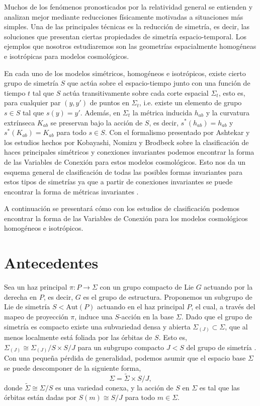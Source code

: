 Muchos de los fen\'{o}menos pronosticados por la relatividad general se entienden y analizan mejor mediante reducciones f\'{i}sicamente motivadas a situaciones m\'{a}s simples. Una de las principales t\'{e}cnicas es la reducci\'{o}n de simetr\'{i}a, es decir, las soluciones que presentan ciertas propiedades de simetr\'{i}a espacio-temporal. Los ejemplos que nosotros estudiaremos son las geometr\'{i}as espacialmente homog\'{e}neas e isotr\'{o}picas para modelos cosmol\'{o}gicos.

En cada uno de los modelos sim\'{e}tricos, homog\'{e}neos e isotr\'{o}picos, existe cierto grupo de simetr\'{i}a $S$ que act\'{u}a sobre el espacio-tiempo junto con una funci\'{o}n de tiempo $t$ tal que $S$ act\'{u}a transitivamente sobre cada corte espacial $\Sigma_{t}$, esto es, para cualquier par $(y, y')$ de puntos en $\Sigma_{t}$, i.e. existe un elemento de grupo $s \in S$ tal que $s(y) = y'$. Adem\'{a}s, en $\Sigma_{t}$  la m\'{e}trica inducida $h_{ab}$ y la curvatura extr\'{i}nseca $K_{ab}$ se preservan bajo la acci\'{o}n de $S$, es decir, $s^{*}(h_{ab}) = h_{ab}$ y $s^{*}(K_{ab}) = K_{ab}$ para todo $s \in S$. Con el formalismo presentado por Ashtekar \cite{Ashtekar86, Ashtekar87} y los estudios hechos por Kobayashi, Nomizu y Brodbeck sobre la clasificaci\'{o}n de haces principales sim\'{e}tricos y conexiones invariantes \cite{Kobayashi, Brodbeck} podemos encontrar la forma de las Variables de Conexi\'{o}n para estos modelos cosmol\'{o}gicos. Esto nos da un esquema general de clasificaci\'{o}n de todas las posibles formas invariantes para estos tipos de simetr\'{i}as ya que a partir de conexiones invariantes se puede encontrar la forma de m\'{e}tricas invariantes \cite{BuildInvariantMetricsFromInvariantConexions}.

A continuaci\'{o}n se presentar\'{a} c\'{o}mo con los estudios de clasificaci\'{o}n podemos encontrar la forma de las Variables de Conexi\'{o}n para los modelos cosmol\'{o}gicos homog\'{e}neos e isotr\'{o}picos.

\section{Antecedentes}

Sea un haz principal $\pi: P \longrightarrow \Sigma$ con un grupo compacto de Lie $G$ actuando por la derecha en $P$, es decir, $G$ es el grupo de estructura. Proponemos un subgrupo de Lie de simetr\'{i}a $S < \mathrm{Aut}(P)$ actuando en el haz principal $P$, el cual, a trav\'{e}s del mapeo de proyecci\'{o}n $\pi$, induce una $S$-acci\'{o}n en la base $\Sigma$. Dado que el grupo de simetr\'{i}a es compacto existe una subvariedad densa y abierta $\Sigma_{(J)} \subset \Sigma$, que al menos localmente est\'{a} foliada por las \'{o}rbitas de $S$. Esto es, $\Sigma_{(J)} \cong  \Sigma_{(J)}/S \times S/J$ para un subgrupo compacto $J < S$ del grupo de simetr\'{i}a \cite{Dieck}. Con una peque\~{n}a p\'{e}rdida de generalidad, podemos asumir que el espacio base $\Sigma$ se puede descomponer de la siguiente forma, $$\Sigma = \tilde{\Sigma} \times S/J,$$ donde $\tilde{\Sigma} \cong \Sigma/S$ es una variedad conexa, y la acci\'{o}n de $S$ en $\Sigma$ es tal que las \'{o}rbitas est\'{a}n dadas por $S(m) \cong S/J$ para todo $m \in \Sigma$.

